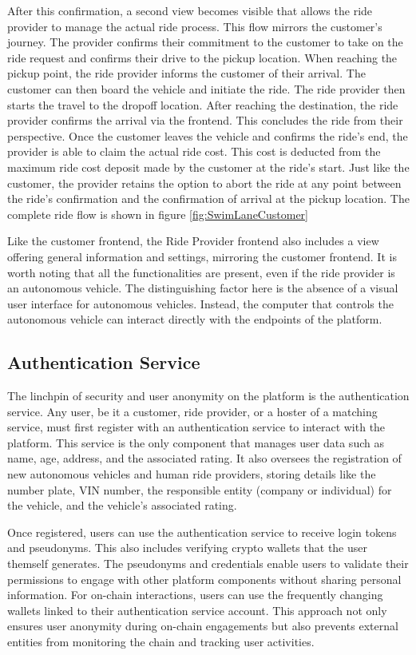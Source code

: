 After this confirmation, a second view becomes visible that allows the ride provider to manage the actual ride process. This flow mirrors the customer's journey. The provider confirms their commitment to the customer to take on the ride request and confirms their drive to the pickup location. When reaching the pickup point, the ride provider informs the customer of their arrival. The customer can then board the vehicle and initiate the ride. The ride provider then starts the travel to the dropoff location. After reaching the destination, the ride provider confirms the arrival via the frontend. This  concludes the ride from their perspective. Once the customer leaves the vehicle and confirms the ride's end, the provider is able to claim the actual ride cost. This cost is deducted from the maximum ride cost deposit made by the customer at the ride's start. 
Just like the customer, the provider retains the option to abort the ride at any point between the ride's confirmation and the confirmation of arrival at the pickup location. The complete ride flow is shown in figure \ref{fig:SwimLaneCustomer}

Like the customer frontend, the Ride Provider frontend also includes a view offering general information and settings, mirroring the customer frontend. It is worth noting that all the functionalities are present, even if the ride provider is an autonomous vehicle. The distinguishing factor here is the absence of a visual user interface for autonomous vehicles. Instead, the computer that controls the autonomous vehicle can interact directly with the endpoints of the platform.

\subsection{Authentication Service}\label{subsec:AuthService}

The linchpin of security and user anonymity on the platform is the authentication service. Any user, be it a customer, ride provider, or a hoster of a matching service, must first register with an authentication service to interact with the platform. This service is the only component that manages user data such as name, age, address, and the associated rating. It also oversees the registration of new autonomous vehicles and human ride providers, storing details like the number plate, VIN number, the responsible entity (company or individual) for the vehicle, and the vehicle's associated rating.

Once registered, users can use the authentication service to receive login tokens and pseudonyms. This also includes verifying crypto wallets that the user themself generates. The pseudonyms and credentials enable users to validate their permissions to engage with other platform components without sharing personal information. For on-chain interactions, users can use the frequently changing wallets linked to their authentication service account. This approach not only ensures user anonymity during on-chain engagements but also prevents external entities from monitoring the chain and tracking user activities. 

